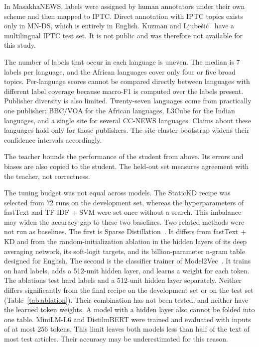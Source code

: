 \documentclass[journal]{IEEEtran}
\begin{document}
In MasakhaNEWS, labels were assigned by human annotators under their own scheme and then mapped to IPTC. Direct annotation with IPTC topics exists only in MN-DS, which is entirely in English. Kuzman and Ljube\v{s}i\'c~\cite{kuzman2025llm} have a multilingual IPTC test set. It is not public and was therefore not available for this study.

The number of labels that occur in each language is uneven. The median is 7 labels per language, and the African languages cover only four or five broad topics. Per-language scores cannot be compared directly between languages with different label coverage because macro-F1 is computed over the labels present. Publisher diversity is also limited. Twenty-seven languages come from practically one publisher: BBC/VOA for the African languages, L3Cube for the Indian languages, and a single site for several CC-NEWS languages. Claims about these languages hold only for those publishers. The site-cluster bootstrap widens their confidence intervals accordingly.

The teacher bounds the performance of the student from above. Its errors and biases are also copied to the student. The held-out set measures agreement with the teacher, not correctness.

The tuning budget was not equal across models. The StaticKD recipe was selected from 72 runs on the development set, whereas the hyperparameters of fastText and TF-IDF + SVM were set once without a search. This imbalance may widen the accuracy gap to these two baselines. Two related methods were not run as baselines. The first is Sparse Distillation~\cite{ye2022sparse}. It differs from fastText + KD and from the random-initialization ablation in the hidden layers of its deep averaging network, its soft-logit targets, and its billion-parameter n-gram table designed for English. The second is the classifier trainer of Model2Vec~\cite{tulkens2024model2vec}. It trains on hard labels, adds a 512-unit hidden layer, and learns a weight for each token. The ablations test hard labels and a 512-unit hidden layer separately. Neither differs significantly from the final recipe on the development set or on the test set (Table~\ref{tab:ablation}). Their combination has not been tested, and neither have the learned token weights. A model with a hidden layer also cannot be folded into one table. MiniLM-L6 and DistilmBERT were trained and evaluated with inputs of at most 256 tokens. This limit leaves both models less than half of the text of most test articles. Their accuracy may be underestimated for this reason.
\end{document}
